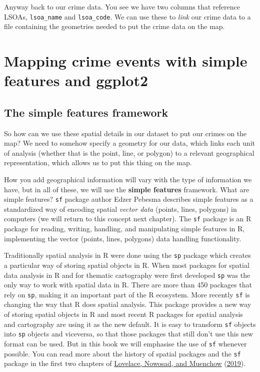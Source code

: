 \documentclass[
]{book}
\begin{document}
Anyway back to our crime data. You see we have two columns that reference LSOAs, \texttt{lsoa\_name} and \texttt{lsoa\_code}. We can use these to \emph{link} our crime data to a file containing the geometries needed to put the crime data on the map.

\hypertarget{mapping-crime-events-with-simple-features-and-ggplot2}{%
\section{Mapping crime events with simple features and ggplot2}\label{mapping-crime-events-with-simple-features-and-ggplot2}}

\hypertarget{the-simple-features-framework}{%
\subsection{The simple features framework}\label{the-simple-features-framework}}

So how can we use these spatial details in our dataset to put our crimes on the map? We need to somehow specify a geometry for our data, which links each unit of analysis (whether that is the point, line, or polygon) to a relevant geographical representation, which allows us to put this thing on the map.

How you add geographical information will vary with the type of information we have, but in all of these, we will use the \textbf{simple features} framework. What are simple features? \texttt{sf} package author Edzer Pebesma describes simple features as a standardized way of encoding spatial \emph{vector data} (points, lines, polygons) in computers (we will return to this concept next chapter). The \texttt{sf} package is an R package for reading, writing, handling, and manipulating simple features in R, implementing the vector (points, lines, polygons) data handling functionality.

Traditionally spatial analysis in R were done using the \texttt{sp} package which creates a particular way of storing spatial objects in R. When most packages for spatial data analysis in R and for thematic cartography were first developed \texttt{sp} was the only way to work with spatial data in R. There are more than 450 packages that rely on \texttt{sp}, making it an important part of the R ecosystem. More recently \texttt{sf} is changing the way that R does spatial analysis. This package provides a new way of storing spatial objects in R and most recent R packages for spatial analysis and cartography are using it as the new default. It is easy to transform \texttt{sf} objects into \texttt{sp} objects and viceversa, so that those packages that still don't use this new format can be used. But in this book we will emphasise the use of \texttt{sf} whenever possible. You can read more about the history of spatial packages and the \texttt{sf} package in the first two chapters of \protect\hyperlink{ref-Lovelace_2019}{Lovelace, Nowosad, and Muenchow} (\protect\hyperlink{ref-Lovelace_2019}{2019}).
\end{document}
